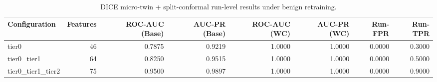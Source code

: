\begin{table}[t]
\centering
\caption{DICE micro-twin + split-conformal run-level results under benign retraining.}
\label{tab:dice_full_overall}
\footnotesize
\begin{tabular}{lrrrrrrr}
\toprule
Configuration & Features & ROC-AUC (Base) & AUC-PR (Base) & ROC-AUC (WC) & AUC-PR (WC) & Run-FPR & Run-TPR \\
\midrule
tier0 & 46 & 0.7875 & 0.9219 & 1.0000 & 1.0000 & 0.0000 & 0.3000 \\
tier0_tier1 & 64 & 0.8250 & 0.9515 & 1.0000 & 1.0000 & 0.0000 & 0.5000 \\
tier0_tier1_tier2 & 75 & 0.9500 & 0.9897 & 1.0000 & 1.0000 & 0.0000 & 0.9000 \\
\bottomrule
\end{tabular}

\end{table}
